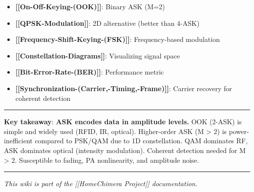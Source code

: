 \begin{itemize}
\tightlist
\item
  \textbf{{[}{[}On-Off-Keying-(OOK){]}{]}}: Binary ASK (M=2)
\item
  \textbf{{[}{[}QPSK-Modulation{]}{]}}: 2D alternative (better than
  4-ASK)
\item
  \textbf{{[}{[}Frequency-Shift-Keying-(FSK){]}{]}}: Frequency-based
  modulation
\item
  \textbf{{[}{[}Constellation-Diagrams{]}{]}}: Visualizing signal space
\item
  \textbf{{[}{[}Bit-Error-Rate-(BER){]}{]}}: Performance metric
\item
  \textbf{{[}{[}Synchronization-(Carrier,-Timing,-Frame){]}{]}}: Carrier
  recovery for coherent detection
\end{itemize}

\begin{center}\rule{0.5\linewidth}{0.5pt}\end{center}

\textbf{Key takeaway}: \textbf{ASK encodes data in amplitude levels.}
OOK (2-ASK) is simple and widely used (RFID, IR, optical). Higher-order
ASK (M \textgreater{} 2) is power-inefficient compared to PSK/QAM due to
1D constellation. QAM dominates RF, ASK dominates optical (intensity
modulation). Coherent detection needed for M \textgreater{} 2.
Susceptible to fading, PA nonlinearity, and amplitude noise.

\begin{center}\rule{0.5\linewidth}{0.5pt}\end{center}

\emph{This wiki is part of the {[}{[}Home\textbar Chimera Project{]}{]}
documentation.}
